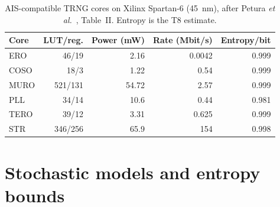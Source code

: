 \begin{table}[htbp]
\centering
\caption{AIS-compatible TRNG cores on Xilinx Spartan-6 (45~nm), after
Petura \emph{et al.}~\cite{petura_2016_survey}, Table~II. Entropy is the
T8 estimate.}
\label{tab:petura}
\begin{tabular}{@{}lrrrr@{}}
\toprule
Core & LUT/reg. & Power (mW) & Rate (Mbit/s) & Entropy/bit \\
\midrule
ERO  & 46/19   & 2.16  & 0.0042 & 0.999 \\
COSO & 18/3    & 1.22  & 0.54   & 0.999 \\
MURO & 521/131 & 54.72 & 2.57   & 0.999 \\
PLL  & 34/14   & 10.6  & 0.44   & 0.981 \\
TERO & 39/12   & 3.31  & 0.625  & 0.999 \\
STR  & 346/256 & 65.9  & 154    & 0.998 \\
\bottomrule
\end{tabular}
\end{table}

\section{Stochastic models and entropy bounds}
\label{sec:soa_models}

